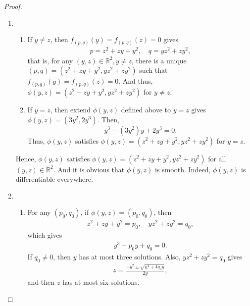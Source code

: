 \documentclass[11pt]{article}
\theoremstyle{definition}
\numberwithin{equation}{subsection}
\begin{document}
\begin{proof}
~\begin{enumerate}[label=(\alph*)]
    \item 
    \begin{enumerate}[label=\arabic*)]
        \item If $y \neq z$, then $f_{(p, q)}(y) = f_{(p, q)}(z) = 0$ gives
        \begin{align*}
            p = z^2 + zy + y^2, \quad q = yz^2 + zy^2,
        \end{align*}
        that is, for any $(y,z) \in \mathbb{R}^2, y \neq z$, there is a unique $(p, q) = \left(z^2 + zy + y^2, yz^2 + zy^2\right)$ such that $f_{(p, q)}(y) = f_{(p, q)}(z) = 0$. And thus, $\phi(y, z) = \left(z^2 + zy + y^2, yz^2 + zy^2\right)$ for $y \neq z$.
        
        \item If $y = z$, then extend $\phi(y,z)$ defined above to $y = z$ gives $\phi(y, z) = (3y^2, 2y^3)$. Then, 
        $$y^3 - (3y^2)y + 2y^3 = 0.$$ 
        Thus, $\phi(y,z)$ satisfies $\phi(y, z) = \left(z^2 + zy + y^2, yz^2 + zy^2\right)$ for $y = z$.
    \end{enumerate}
    Hence, $\phi(y, z)$ satisfies $\phi(y, z) = \left(z^2 + zy + y^2, yz^2 + zy^2\right)$ for all $(y, z) \in \mathbb{R}^2$. And it is obvious that $\phi(y, z)$ is smooth. Indeed, $\phi(y, z)$ is differentiable everywhere.
    
    \item 
    \begin{enumerate}[label=\arabic*)]
        \item For any $(p_0, q_0)$, if $\phi(y, z) = (p_0, q_0)$, then 
        \begin{align*}
            z^2 + zy + y^2 = p_0, \quad yz^2 + zy^2 = q_0,
        \end{align*}
        which gives
        \begin{align*}
            y^3 - p_0 y + q_0 = 0.
        \end{align*}
        If $q_0 \neq 0$, then $y$ has at most three solutions. Also, $yz^2 + zy^2 = q_0$ gives
        \begin{align*}
            z = \frac{-y^2 \pm \sqrt{y^4 + 4q_0y}}{2y},
        \end{align*}
        and then $z$ has at most six solutions.
        

\end{enumerate}
\end{enumerate}
\end{proof}
\end{document}

